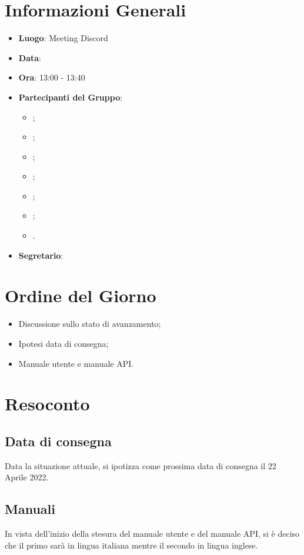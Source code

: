 \section{Informazioni Generali}

\begin{itemize}
	\item{\textbf{Luogo}}: Meeting Discord
	\item{\textbf{Data}}: \D
	\item{\textbf{Ora}}: 13:00 - 13:40
	\item{\textbf{Partecipanti del Gruppo}}:
	\begin{itemize}
		\item{\EP{};}
		\item{\FP{};}
		\item{\GC{};}
		\item{\LW{};}
		\item{\MB{};}
		\item{\MG{};}
		\item{\PV{}.}
	\end{itemize}
	\item{\textbf{Segretario}}: \PV{}
\end{itemize}

\section{Ordine del Giorno}
\begin{itemize}
	\item{Discussione sullo stato di avanzamento;}
	\item{Ipotesi data di consegna;}
	\item{Manuale utente e manuale API.}
\end{itemize}

\section{Resoconto}

\subsection{Data di consegna}
Data la situazione attuale, si ipotizza come prossima data di consegna il 22 Aprile 2022.

\subsection{Manuali}
In vista dell'inizio della stesura del manuale utente e del manuale API, si è deciso che il primo sarà in lingua italiana mentre il secondo in lingua inglese.


